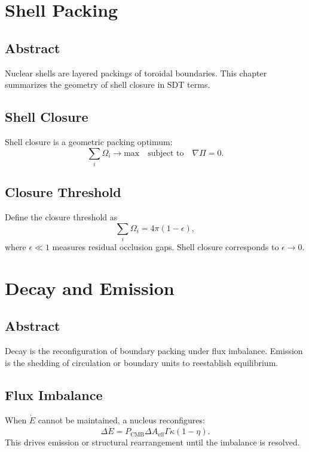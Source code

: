 \documentclass[12pt]{book}
\begin{document}
\chapter{Shell Packing}

\section*{Abstract}
Nuclear shells are layered packings of toroidal boundaries. This chapter summarizes the geometry of shell
closure in SDT terms.

\section{Shell Closure}
Shell closure is a geometric packing optimum:
\begin{equation}
\sum_i \Omega_i \rightarrow \text{max} \quad \text{subject to} \quad \nabla \Pi = 0.
\end{equation}

\section{Closure Threshold}
Define the closure threshold as
\begin{equation}
\sum_i \Omega_i = 4\pi (1-\epsilon),
\end{equation}
where $\epsilon \ll 1$ measures residual occlusion gaps. Shell closure corresponds to $\epsilon \to 0$.

\chapter{Decay and Emission}

\section*{Abstract}
Decay is the reconfiguration of boundary packing under flux imbalance. Emission is the shedding of
circulation or boundary units to reestablish equilibrium.

\section{Flux Imbalance}
When $\dot{E}$ cannot be maintained, a nucleus reconfigures:
\begin{equation}
\Delta \dot{E} = P_{\text{CMB}} \Delta A_{\text{eff}} \Gamma \kappa (1-\eta).
\end{equation}
This drives emission or structural rearrangement until the imbalance is resolved.
\end{document}
